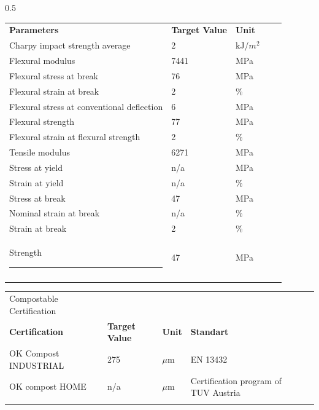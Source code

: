 \documentclass{article}
\begin{document}
\begin{center}
\begin{paracol}{2}
\begin{tabularx}{0.5\textwidth}
\end{tabularx}\switchcolumn\begin{tabularx}{0.5\textwidth}
{X l  l  l  l }\textbf{Parameters} & \textbf{Target Value} & \textbf{Unit} &  &  \\
Charpy impact strength average & 2 & kJ/\(m^2\) &  &  \\
\arrayrulecolor{line_color}\hline
Flexural modulus & 7441 & MPa &  &  \\
\arrayrulecolor{line_color}\hline
Flexural stress at break & 76 & MPa &  &  \\
\arrayrulecolor{line_color}\hline
Flexural strain at break & 2 & \% &  &  \\
\arrayrulecolor{line_color}\hline
Flexural stress at conventional deflection & 6 & MPa &  &  \\
\arrayrulecolor{line_color}\hline
Flexural strength & 77 & MPa &  &  \\
\arrayrulecolor{line_color}\hline
Flexural strain at flexural strength & 2 & \% &  &  \\
\arrayrulecolor{line_color}\hline
Tensile modulus & 6271 & MPa &  &  \\
\arrayrulecolor{line_color}\hline
Stress at yield & n/a & MPa &  &  \\
\arrayrulecolor{line_color}\hline
Strain at yield & n/a & \% &  &  \\
\arrayrulecolor{line_color}\hline
Stress at break & 47 & MPa &  &  \\
\arrayrulecolor{line_color}\hline
Nominal strain at break & n/a & \% &  &  \\
\arrayrulecolor{line_color}\hline
Strain at break & 2 & \% &  &  \\
\arrayrulecolor{line_color}\hline
Strength \rule{80pt}{0pt} & 47 & MPa &  &  \\
\arrayrulecolor{line_color}\hline

\end{tabularx}
\end{paracol}
\end{center}
\begin{center}
\begin{tabularx}
{\textwidth}{X l  l  l  l }\rowcolor{color_title}Compostable Certification &  &  &  &  \\
\textbf{Certification} & \textbf{Target Value} & \textbf{Unit} & \textbf{Standart} &  \\
OK Compost INDUSTRIAL & 275 & \(\mu\)m & EN 13432 &  \\
\arrayrulecolor{line_color}\hline
OK compost HOME & n/a & \(\mu\)m & Certification program of TUV Austria &  \\
\arrayrulecolor{line_color}\hline

\end{tabularx}
\end{center}
\end{document}
